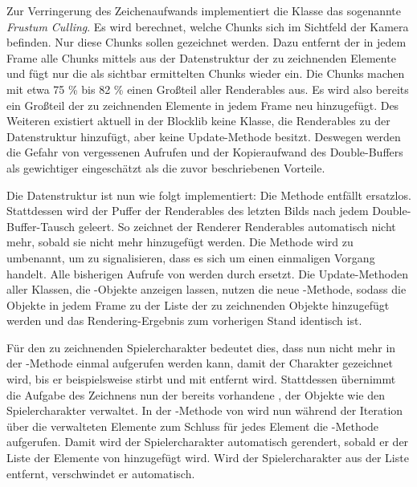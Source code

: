 Zur Verringerung des Zeichenaufwands implementiert die Klasse \classChunkManager{} das sogenannte \emph{Frustum Culling}. Es wird berechnet, welche Chunks sich im Sichtfeld der Kamera befinden. Nur diese Chunks sollen gezeichnet werden. Dazu entfernt der \classChunkManager{} in jedem Frame alle Chunks mittels  aus der Datenstruktur der zu zeichnenden Elemente und fügt nur die als sichtbar ermittelten Chunks wieder ein. Die Chunks machen mit etwa 
75 \% bis
82 \% einen Großteil aller Renderables aus. Es wird also bereits ein Großteil der zu zeichnenden Elemente in jedem Frame neu hinzugefügt. Des Weiteren existiert aktuell in der Blocklib keine Klasse, die Renderables zu der Datenstruktur hinzufügt, aber keine Update-Methode besitzt. Deswegen werden die Gefahr von vergessenen  Aufrufen und der Kopieraufwand des Double-Buffers als gewichtiger eingeschätzt als die zuvor beschriebenen Vorteile.

Die Datenstruktur ist nun wie folgt implementiert: Die Methode  entfällt ersatzlos. Stattdessen wird der Puffer der Renderables des letzten Bilds nach jedem  Double-Buffer-Tausch geleert. So zeichnet der Renderer Renderables automatisch nicht mehr, sobald sie nicht mehr hinzugefügt werden. Die Methode  wird zu  umbenannt, um zu signalisieren, dass es sich um einen einmaligen Vorgang handelt. Alle bisherigen Aufrufe von  werden durch  ersetzt. Die Update-Methoden aller Klassen, die \classRenderable{}-Objekte anzeigen lassen, nutzen die neue -Methode, sodass die Objekte in jedem Frame zu der Liste der zu zeichnenden Objekte hinzugefügt werden und das Rendering-Ergebnis zum vorherigen Stand identisch ist.

\begin{example}
	Für den zu zeichnenden Spielercharakter bedeutet dies, dass nun nicht mehr in der -Methode einmal  aufgerufen werden kann, damit der Charakter gezeichnet wird, bis er beispielsweise stirbt und mit  entfernt wird. Stattdessen übernimmt die Aufgabe des Zeichnens nun der bereits vorhandene \classEntityManager{}, der Objekte wie den Spielercharakter verwaltet. In der -Methode von \classEntityManager{} wird nun während der Iteration über die verwalteten Elemente zum Schluss für jedes Element die -Methode aufgerufen. Damit wird der Spielercharakter automatisch gerendert, sobald er der Liste der Elemente von \classEntityManager{} hinzugefügt wird. Wird der Spielercharakter aus der Liste entfernt, verschwindet er automatisch.
\end{example}

